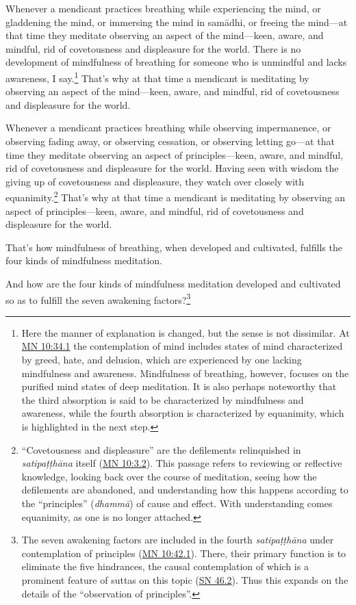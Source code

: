 \documentclass[12pt,openany]{book}%
\begin{document}
Whenever a mendicant practices breathing while experiencing the mind, or gladdening the mind, or immersing the mind in \textsanskrit{samādhi}, or freeing the mind—at that time they meditate observing an aspect of the mind—keen, aware, and mindful, rid of covetousness and displeasure for the world. There is no development of mindfulness of breathing for someone who is unmindful and lacks awareness, I say.\footnote{Here the manner of explanation is changed, but the sense is not dissimilar. At \href{https://suttacentral.net/mn10/en/sujato\#34.1}{MN 10:34.1} the contemplation of mind includes states of mind characterized by greed, hate, and delusion, which are experienced by one lacking mindfulness and awareness. Mindfulness of breathing, however, focuses on the purified mind states of deep meditation. It is also perhaps noteworthy that the third absorption is said to be characterized by mindfulness and awareness, while the fourth absorption is characterized by equanimity, which is highlighted in the next step. } That’s why at that time a mendicant is meditating by observing an aspect of the mind—keen, aware, and mindful, rid of covetousness and displeasure for the world. 

Whenever a mendicant practices breathing while observing impermanence, or observing fading away, or observing cessation, or observing letting go—at that time they meditate observing an aspect of principles—keen, aware, and mindful, rid of covetousness and displeasure for the world. Having seen with wisdom the giving up of covetousness and displeasure, they watch over closely with equanimity.\footnote{“Covetousness and displeasure” are the defilements relinquished in \textit{\textsanskrit{satipaṭṭhāna}} itself (\href{https://suttacentral.net/mn10/en/sujato\#3.2}{MN 10:3.2}). This passage refers to reviewing or reflective knowledge, looking back over the course of meditation, seeing how the defilements are abandoned, and understanding how this happens according to the “principles” (\textit{\textsanskrit{dhammā}}) of cause and effect. With understanding comes equanimity, as one is no longer attached. } That’s why at that time a mendicant is meditating by observing an aspect of principles—keen, aware, and mindful, rid of covetousness and displeasure for the world. 

That’s how mindfulness of breathing, when developed and cultivated, fulfills the four kinds of mindfulness meditation. 

And how are the four kinds of mindfulness meditation developed and cultivated so as to fulfill the seven awakening factors?\footnote{The seven awakening factors are included in the fourth \textit{\textsanskrit{satipaṭṭhāna}} under contemplation of principles (\href{https://suttacentral.net/mn10/en/sujato\#42.1}{MN 10:42.1}). There, their primary function is to eliminate the five hindrances, the causal contemplation of which is a prominent feature of suttas on this topic (\href{https://suttacentral.net/sn46.2/en/sujato}{SN 46.2}). Thus this expands on the details of the “observation of principles”. } 
\end{document}
